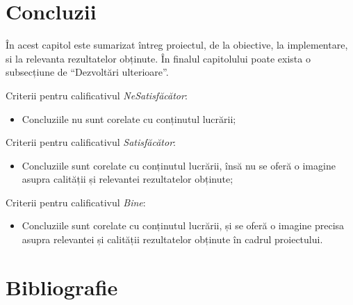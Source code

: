 \documentclass[12pt,a4paper]{report}
\begin{document}
\chapter{Concluzii}
În acest capitol este sumarizat întreg proiectul, de la obiective, la implementare, si la relevanta rezultatelor obținute. În finalul capitolului poate exista o subsecțiune de ``Dezvoltări ulterioare''.

Criterii pentru calificativul \textit{Ne\textit{Satisfăcător}}: 
\begin{itemize}
	\item	Concluziile nu sunt corelate cu conținutul lucrării;
\end{itemize}

Criterii pentru calificativul \textit{Satisfăcător}: 
\begin{itemize}
	\item	Concluziile sunt corelate cu conținutul lucrării, însă nu se oferă o imagine asupra calității și relevantei rezultatelor obținute;
\end{itemize}

Criterii pentru calificativul \textit{Bine}: 
\begin{itemize}
	\item	Concluziile sunt corelate cu conținutul lucrării, și se oferă o imagine precisa asupra relevantei și calității rezultatelor obținute în cadrul proiectului. 
\end{itemize}

\chapter{Bibliografie}
% 
% 
\end{document}
